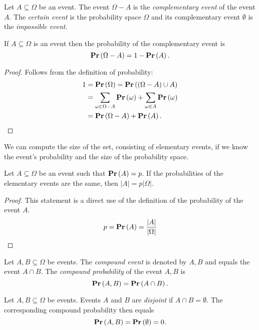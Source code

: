 \begin{definition}
Let $A \subseteq \Omega$ be an event. The event $\Omega - A$ is the \emph{complementary event} of the event $A$. The \emph{certain event} is the probability space $\Omega$ and its complementary event $\emptyset$ is the \emph{impossible event}.
\end{definition}

\begin{corollary}
If $A \subseteq \Omega$ is an event then the probability of the complementary event is 
\[ 
	\mathbf{Pr}\left(\Omega - A\right) = 1 - \mathbf{Pr}\left(A\right) \text{.} 
\] 
\end{corollary}
\begin{proof}
Follows from the definition of probability:
\[
\begin{split}
1 
	& = \mathbf{Pr}\left(\Omega\right) = \mathbf{Pr}\left((\Omega - A) \cup A\right) \\
	& = \displaystyle\sum_{\omega \in \Omega - A} \mathbf{Pr}\left(\omega\right) + \displaystyle\sum_{\omega \in A} \mathbf{Pr}\left(\omega\right) \\
	& = \mathbf{Pr}\left(\Omega - A\right) + \mathbf{Pr}\left(A\right) \text{.}
\end{split}
\]
\end{proof}

We can compute the size of the set, consisting of elementary events, if we know the event's probability and the size of the probability space.

\begin{lemma}
Let $A \subseteq \Omega$ be an event such that $\mathbf{Pr}\left(A\right) = p$. If the probabilities of the elementary events are the same, then $|A| = p |\Omega|$.
\end{lemma}
\begin{proof}
This statement is a direct use of the definition of the probability of the event $A$.
\[
p = \mathbf{Pr}\left(A\right) = \frac{|A|}{|\Omega|}
\]
\end{proof}

\begin{definition}
Let $A, B \subseteq \Omega$ be events. The \emph{compound event} is denoted by $A, B$ and equals the event $A \cap B$. The \emph{compound probability} of the event $A, B$ is
\[
\mathbf{Pr}\left(A, B\right) = \mathbf{Pr}\left(A \cap B\right) \text{.}
\]
\end{definition}

\begin{definition}
Let $A, B \subseteq \Omega$ be events. Events $A$ and $B$ are \emph{disjoint} if $A \cap B = \emptyset$. The corresponding compound probability then equals
\[
\mathbf{Pr}\left(A, B\right) = \mathbf{Pr}\left(\emptyset\right) = 0 \text{.}
\]
\end{definition}

